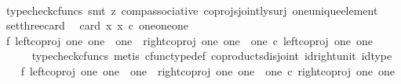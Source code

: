\begin{isabellebody}
\ \ \ \ \isamarkupfalse%
\ {\isacharparenleft}{\kern0pt}typecheck{\isacharunderscore}{\kern0pt}cfuncs{\isacharcomma}{\kern0pt}\ smt\ {\isacharparenleft}{\kern0pt}z{}{\isacharparenright}{\kern0pt}\ comp{\isacharunderscore}{\kern0pt}associative{}\ coprojs{\isacharunderscore}{\kern0pt}jointly{\isacharunderscore}{\kern0pt}surj\ one{\isacharunderscore}{\kern0pt}unique{\isacharunderscore}{\kern0pt}element{\isacharparenright}{\kern0pt}\isanewline
{}\isamarkupfalse%
%
\endisatagproof
{\isafoldproof}%
%
\isadelimproof
\isanewline
%
\endisadelimproof
\isanewline
{}\isamarkupfalse%
\ set{\isacharunderscore}{\kern0pt}three{\isacharunderscore}{\kern0pt}card{\isacharcolon}{\kern0pt}\ \isanewline
\ {\isachardoublequoteopen}card\ {\isacharbraceleft}{\kern0pt}x{\isachardot}{\kern0pt}\ x\ {\isasymin}\isactrlsub c\ {\isacharparenleft}{\kern0pt}one{\isasymCoprod}{\isacharparenleft}{\kern0pt}one{\isasymCoprod}one{\isacharparenright}{\kern0pt}{\isacharparenright}{\kern0pt}{\isacharbraceright}{\kern0pt}\ {\isacharequal}{\kern0pt}\ {}{\isachardoublequoteclose}\isanewline
%
\isadelimproof
%
\endisadelimproof
%
\isatagproof
{}\isamarkupfalse%
\ {\isacharminus}{\kern0pt}\ \isanewline
\ \ \isamarkupfalse%
\ f{}{\isacharcolon}{\kern0pt}\ {\isachardoublequoteopen}left{\isacharunderscore}{\kern0pt}coproj\ one\ {\isacharparenleft}{\kern0pt}one\ {\isasymCoprod}\ one{\isacharparenright}{\kern0pt}\ {\isasymnoteq}\ right{\isacharunderscore}{\kern0pt}coproj\ one\ {\isacharparenleft}{\kern0pt}one\ {\isasymCoprod}\ one{\isacharparenright}{\kern0pt}\ {\isasymcirc}\isactrlsub c\ left{\isacharunderscore}{\kern0pt}coproj\ one\ one{\isachardoublequoteclose}\isanewline
\ \ \ \ \isamarkupfalse%
\ {\isacharparenleft}{\kern0pt}typecheck{\isacharunderscore}{\kern0pt}cfuncs{\isacharcomma}{\kern0pt}\ metis\ cfunc{\isacharunderscore}{\kern0pt}type{\isacharunderscore}{\kern0pt}def\ coproducts{\isacharunderscore}{\kern0pt}disjoint\ id{\isacharunderscore}{\kern0pt}right{\isacharunderscore}{\kern0pt}unit\ id{\isacharunderscore}{\kern0pt}type{\isacharparenright}{\kern0pt}\isanewline
\ \ \isamarkupfalse%
\ f{}{\isacharcolon}{\kern0pt}\ {\isachardoublequoteopen}left{\isacharunderscore}{\kern0pt}coproj\ one\ {\isacharparenleft}{\kern0pt}one\ {\isasymCoprod}\ one{\isacharparenright}{\kern0pt}\ {\isasymnoteq}\ right{\isacharunderscore}{\kern0pt}coproj\ one\ {\isacharparenleft}{\kern0pt}one\ {\isasymCoprod}\ one{\isacharparenright}{\kern0pt}\ {\isasymcirc}\isactrlsub c\ right{\isacharunderscore}{\kern0pt}coproj\ one\ one{\isachardoublequoteclose}\isanewline

\end{isabellebody}
